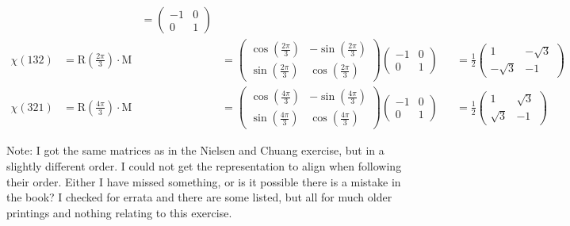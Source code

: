 \documentclass[12pt]{extarticle}
\begin{document}
\begin{align*}
&& = \begin{pmatrix} -1 & 0 \\ 0 & 1 \end{pmatrix}\\
\chi(132) & = \text{R}\left(\frac{2\pi}{3}\right) \cdot \text{M}
&& = \begin{pmatrix} \cos(\frac{2\pi}{3}) & -\sin(\frac{2\pi}{3}) \\ \sin(\frac{2\pi}{3}) & \cos(\frac{2\pi}{3}) \end{pmatrix} \begin{pmatrix}-1 & 0 \\ 0 & 1\end{pmatrix}
&& = \frac{1}{2} \begin{pmatrix} 1 & -\sqrt{3} \\ -\sqrt{3} & -1 \end{pmatrix} \\
\chi(321) & = \text{R}\left(\frac{4\pi}{3}\right) \cdot \text{M}
&& = \begin{pmatrix} \cos(\frac{4\pi}{3}) & -\sin(\frac{4\pi}{3}) \\ \sin(\frac{4\pi}{3}) & \cos(\frac{4\pi}{3}) \end{pmatrix} \begin{pmatrix}-1 & 0 \\ 0 & 1\end{pmatrix}
&& = \frac{1}{2} \begin{pmatrix} 1 & \sqrt{3} \\ \sqrt{3} & -1 \end{pmatrix}
\end{align*}

Note: I got the same matrices as in the Nielsen and Chuang exercise, but in a slightly different order.
I could not get the representation to align when following their order.
Either I have missed something, or is it possible there is a mistake in the book?
I checked for errata and there are some listed, but all for much older printings and nothing relating to this exercise.
\end{document}
